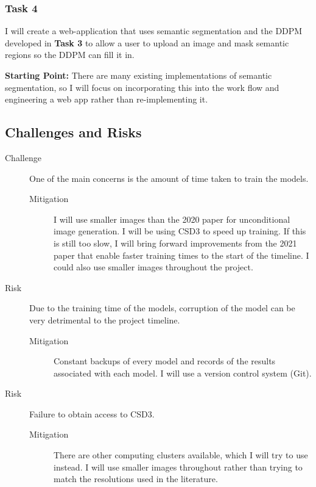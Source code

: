 \documentclass{article}
\begin{document}
\subsubsection{Task 4}
I will create a web-application that uses semantic segmentation and the DDPM developed in \textbf{Task 3} to allow a user to upload an image and mask semantic regions so the DDPM can fill it in.

\noindent\textbf{Starting Point: } There are many existing implementations of semantic segmentation, so I will focus on incorporating this into the work flow and engineering a web app rather than re-implementing it.

\subsection{Challenges and Risks}

\begin{description}
\item[Challenge] One of the main concerns is the amount of time taken to train the models.
\begin{description}
\item[Mitigation] I will use smaller images than the 2020 paper for unconditional image generation. I will be using CSD3 to speed up training. If this is still too slow, I will bring forward improvements from the 2021 paper that enable faster training times to the start of the timeline. I could also use smaller images throughout the project.
\end{description}
\item[Risk] Due to the training time of the models, corruption of the model can be very detrimental to the project timeline.
\begin{description}
\item[Mitigation] Constant backups of every model and records of the results associated with each model. I will use a version control system (Git).
\end{description}
\item[Risk] Failure to obtain access to CSD3.
\begin{description}
\item[Mitigation] There are other computing clusters available, which I will try to use instead. I will use smaller images throughout rather than trying to match the resolutions used in the literature.
\end{description}
\end{description}
\end{document}
